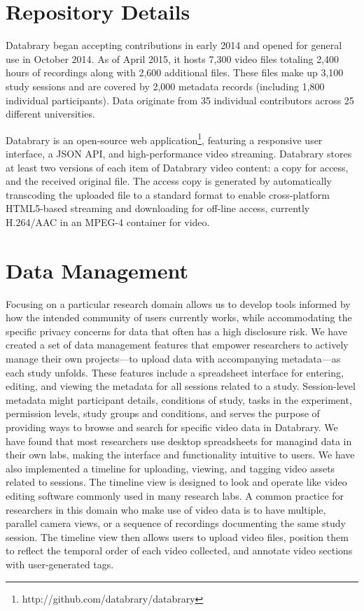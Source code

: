 \documentclass{sig-alternate}
\begin{document}
\section{Repository Details}

Databrary began accepting contributions in early 2014 and opened for general use in October 2014.
As of April 2015, it hosts 7,300 video files totaling 2,400 hours of recordings along with 2,600 additional files.
These files make up 3,100 study sessions and are covered by 2,000 metadata records (including 1,800 individual participants).
Data originate from 35 individual contributors across 25 different universities.

Databrary is an open-source web application\footnote{http://github.com/databrary/databrary}, featuring a responsive user interface, a JSON API, and high-performance video streaming.
Databrary stores at least two versions of each item of Databrary video content: a copy for access, and the received original file.
The access copy is generated by automatically transcoding the uploaded file to a standard format to enable cross-platform HTML5-based streaming and downloading for off-line access, currently H.264/AAC in an MPEG-4 container for video.

\section{Data Management}

Focusing on a particular research domain allows us to develop tools informed by how the intended community of users currently works, while accommodating the specific privacy concerns for data that often has a high disclosure risk.
We have created a set of data management features that empower researchers to actively manage their own projects---to upload data with accompanying metadata---as each study unfolds. 
These features include a spreadsheet interface for entering, editing, and viewing the metadata for all sessions related to a study. Session-level metadata might participant details, conditions of study, tasks in the experiment, permission levels, study groups and conditions, and serves the purpose of providing ways to browse and search for specific video data in Databrary. 
We have found that most researchers use desktop spreadsheets for managind data in their own labs, making the interface and functionality intuitive to users. 
We have also implemented a timeline for uploading, viewing, and tagging video assets related to sessions.
The timeline view is designed to look and operate like video editing software commonly used in many research labs.
A common practice for researchers in this domain who make use of video data is to have multiple, parallel camera views, or a sequence of recordings documenting the same study session.
The timeline view then allows users to upload video files, position them to reflect the temporal order of each video collected, and annotate video sections with user-generated tags. 
\end{document}
